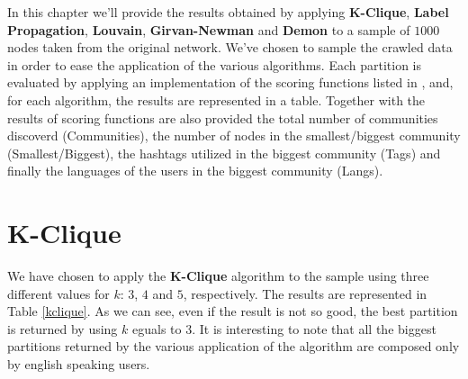 In this chapter we'll provide the results obtained by applying \textbf{K-Clique}, \textbf{Label Propagation},
\textbf{Louvain}, \textbf{Girvan-Newman} and \textbf{Demon} to a sample of $1000$ nodes taken from the original
network. We've chosen to sample the crawled data in order to ease the application of the various algorithms.
Each partition is evaluated by applying an implementation of the scoring functions listed in
\cite{comm_ground_truth}, and, for each algorithm, the results are represented in a table. Together with the
results of scoring functions are also provided the total number of communities discoverd (Communities), the
number of nodes in the smallest/biggest community (Smallest/Biggest), the hashtags utilized in the biggest
community (Tags) and finally the languages of the users in the biggest community (Langs).

\section{K-Clique} %
\label{sec:k_clique}
    We have chosen to apply the \textbf{K-Clique} algorithm to the sample using three different values for
    $k$: $3$, $4$ and $5$, respectively. The results are represented in Table \ref{kclique}. As we can see, even
    if the result is not so good, the best partition is returned by using $k$ eguals to $3$. It is interesting to
    note that all the biggest partitions returned by the various application of the algorithm are composed only by
    english speaking users.

    \begin{table}[H]
        \centering
        \begin{subtable}{\textwidth}
        \end{subtable}
        \caption{Evaluation of the partitions obtained by the application of the K-Clique algorithm.}
        \label{kclique}
    \end{table}

